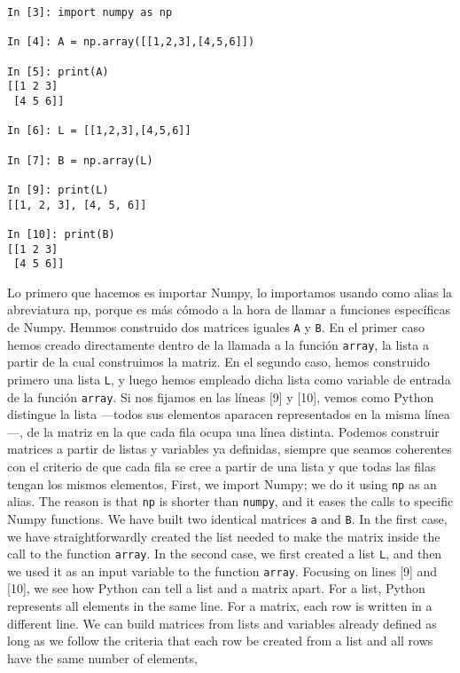 \begin{center}
    \begin{minipage}{0.4\textwidth}
    \begin{verbatim}
In [3]: import numpy as np

In [4]: A = np.array([[1,2,3],[4,5,6]])

In [5]: print(A)
[[1 2 3]
 [4 5 6]]

In [6]: L = [[1,2,3],[4,5,6]]

In [7]: B = np.array(L)

In [9]: print(L)
[[1, 2, 3], [4, 5, 6]]

In [10]: print(B)
[[1 2 3]
 [4 5 6]]
 \end{verbatim}
\end{minipage}
 \end{center}
\begin{paracol}{2} 
Lo primero que hacemos es importar Numpy, lo importamos usando como alias la abreviatura np, porque es más cómodo a la hora de llamar a funciones específicas de Numpy.  Hemmos construido dos matrices iguales \texttt{A} y \texttt{B}. En el primer caso hemos creado directamente dentro de la llamada a la función \texttt{array}, la lista a partir de la cual construimos la matriz. En el segundo caso, hemos construido primero una lista \texttt{L}, y luego hemos empleado dicha lista como variable de entrada de la función \texttt{array}. Si nos fijamos en las líneas [9] y [10], vemos como Python distingue la lista ---todos sus elementos aparacen representados en la misma línea---, de la matriz en la que cada fila ocupa una línea distinta. Podemos construir matrices a partir de listas y variables ya definidas, siempre que seamos coherentes con el criterio de que cada fila se cree a partir de una lista y que todas las filas tengan los mismos elementos,
\switchcolumn
First, we import Numpy; we do it using \texttt{np} as an alias. The reason is that \texttt{np} is shorter than \texttt{numpy}, and it eases the calls to specific Numpy functions. We have built two identical matrices \texttt{a} and \texttt{B}. In the first case, we have straightforwardly created the list needed to make the matrix inside the call to the function \texttt{array}. In the second case, we first created a list \texttt{L}, and then we used it as an input variable to the function \texttt{array}. Focusing on lines [9] and [10], we see how Python can tell a list and a matrix apart. For a list, Python represents all elements in the same line. For a matrix, each row is written in a different line.
We can build matrices from lists and variables already defined as long as we follow the criteria that each row be created from a list and all rows have the same number of elements,  
\end{paracol}
